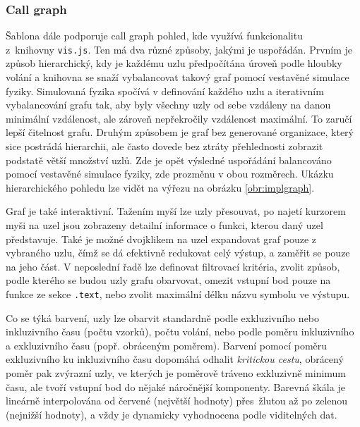 \documentclass[czech,BP]{thesiskiv}
\begin{document}
\subsubsection*{Call graph}

Šablona dále podporuje call graph pohled, kde využívá funkcionalitu \\z~knihovny \texttt{vis.js}. Ten má dva různé způsoby, jakými je uspořádán. Prvním je způsob hierarchický, kdy je každému uzlu předpočítána úroveň podle hloubky volání a knihovna se snaží vybalancovat takový graf pomocí vestavěné simulace fyziky. Simulovaná fyzika spočívá v definování  každého uzlu a iterativním vybalancování grafu tak, aby byly všechny uzly od sebe vzdáleny na danou minimální vzdálenost, ale zároveň nepřekročily vzdálenost maximální. To zaručí lepší čitelnost grafu. Druhým způsobem je graf bez generované organizace, který sice postrádá hierarchii, ale často dovede bez ztráty přehlednosti zobrazit podstatě větší množství uzlů. Zde je opět výsledné uspořádání balancováno pomocí vestavěné simulace fyziky, zde prozměnu v obou rozměrech. Ukázku hierarchického pohledu lze vidět na výřezu na obrázku \ref{obr:implgraph}.

Graf je také interaktivní. Tažením myší lze uzly přesouvat, po najetí kurzorem myši na uzel jsou zobrazeny detailní informace o funkci, kterou daný uzel představuje. Také je možné dvojklikem na uzel expandovat graf pouze z vybraného uzlu, čímž se dá efektivně redukovat celý výstup, a zaměřit se pouze na jeho část. V neposlední řadě lze definovat filtrovací kritéria, zvolit způsob, podle kterého se budou uzly grafu obarvovat, omezit vstupní bod pouze na funkce ze sekce \texttt{.text}, nebo zvolit maximální délku názvu symbolu ve výstupu.

Co se týká barvení, uzly lze obarvit standardně podle exkluzivního nebo inkluzivního času (počtu vzorků), počtu volání, nebo podle poměru inkluzivního a exkluzivního času (popř. obráceným poměrem). Barvení pomocí poměru exkluzivního ku inkluzivního času dopomáhá odhalit \emph{kritickou cestu}, obrácený poměr pak zvýrazní uzly, ve kterých je poměrově tráveno exkluzivně minimum času, ale tvoří vstupní bod do nějaké náročnější komponenty. Barevná škála je lineárně interpolována od červené (největší hodnoty) přes~žlutou až po zelenou (nejnižší hodnoty), a vždy je dynamicky vyhodnocena podle viditelných dat.
\end{document}
